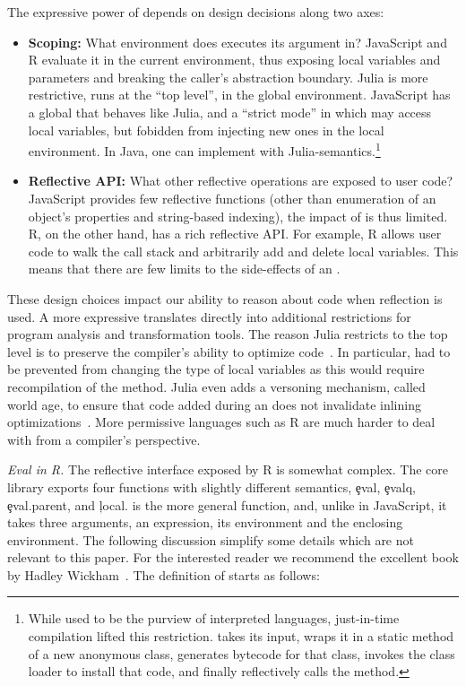 \documentclass[acmsmall]{acmart}
\newcommand{\mypara}[1]{\medskip\noindent\emph{#1}\xspace}
\begin{document}
The expressive power of \eval depends on design decisions along two
axes:
\begin{itemize}
\item {\bf Scoping:} What environment does \eval executes its argument
  in? JavaScript and R evaluate it in the current environment, thus
  exposing local variables and parameters and breaking the caller's
  abstraction boundary. Julia is more restrictive, \eval runs at the
  ``top level'', in the global environment. JavaScript has a global
  \eval that behaves like Julia, and a ``strict mode'' in which \eval
  may access local variables, but fobidden from injecting new ones in
  the local environment. In Java, one can implement \eval with
  Julia-semantics.\footnote{While \eval used to be the purview of
  interpreted languages, just-in-time compilation lifted this
  restriction. \Eval takes its input, wraps it in a static method of a
  new anonymous class, generates bytecode for that class, invokes
  the class loader to install that code, and finally reflectively
  calls the method. }
\item {\bf Reflective API:} What other reflective operations are
  exposed to user code? JavaScript provides few reflective functions
  (other than enumeration of an object's properties and string-based
  indexing), the impact of \eval is thus limited. R, on the other
  hand, has a rich reflective API. For example, R allows user code to
  walk the call stack and arbitrarily add and delete local variables.
  This means that there are few limits to the side-effects of an
  \eval.
\end{itemize}

\noindent
These design choices impact our ability to reason about code when
reflection is used. A more expressive \eval translates directly into
additional restrictions for program analysis and transformation tools.
The reason Julia restricts \eval to the top level is to preserve the
compiler's ability to optimize code~\cite{oopsla18a}. In particular,
\eval had to be prevented from changing the type of local variables as
this would require recompilation of the method. Julia even adds a
versoning mechanism, called world age, to ensure that code added
during an \eval does not invalidate inlining
optimizations~\cite{oopsla20a}. More permissive languages such as R
are much harder to deal with from a compiler's perspective.

\mypara{Eval in R.} The reflective interface exposed by
R is somewhat complex. The core library exports four functions with
slightly different semantics, \c{eval}, \c{evalq}, \c{eval.parent},
and \c{local}. \Eval is the more general function, and, unlike in
JavaScript, it takes three arguments, an expression, its environment
and the enclosing environment. The following discussion simplify some
details which are not relevant to this paper. For the interested
reader we recommend the excellent book by Hadley
Wickham~\cite{hadley}. The definition of \eval starts as follows:
\end{document}
